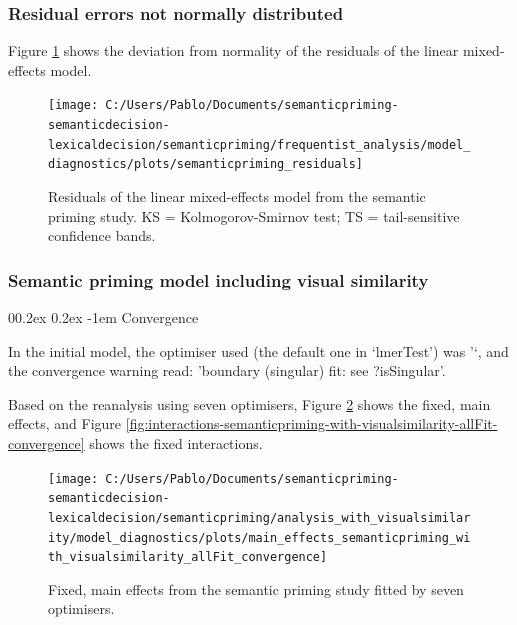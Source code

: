 \documentclass[
  12pt,
  man,floatsintext]{apa7}
\makeatletter
\let\oldparagraph\paragraph
\renewcommand{\paragraph}[1]{\oldparagraph{#1}\mbox{}}
\renewcommand{\paragraph}{\@startsection{paragraph}{4}{\parindent}%
  {0\baselineskip \@plus 0.2ex \@minus 0.2ex}%
  {-1em}%
  {\normalfont\normalsize\bfseries\itshape\typesectitle}}
\makeatother
\begin{document}
\hypertarget{residual-errors-not-normally-distributed-1}{%
\subsubsection{Residual errors not normally distributed}\label{residual-errors-not-normally-distributed-1}}

Figure \ref{fig:semanticpriming-residuals} shows the deviation from normality of the residuals of the linear mixed-effects model.

\begin{figure}

{\centering \texttt{[image: C:/Users/Pablo/Documents/semanticpriming-semanticdecision-lexicaldecision/semanticpriming/frequentist\_analysis/model\_diagnostics/plots/semanticpriming\_residuals]} 

}

\caption{Residuals of the linear mixed-effects model from the semantic priming study. \linebreak KS = Kolmogorov-Smirnov test; TS = tail-sensitive confidence bands.}\label{fig:semanticpriming-residuals}
\end{figure}

\hypertarget{semantic-priming-model-including-visual-similarity}{%
\subsubsection{Semantic priming model including visual similarity}\label{semantic-priming-model-including-visual-similarity}}

\hypertarget{convergence-3}{%
\paragraph{Convergence}\label{convergence-3}}

In the initial model, the optimiser used (the default one in `lmerTest') was '`, and the convergence warning read: 'boundary (singular) fit: see ?isSingular'.

Based on the reanalysis using seven optimisers, Figure \ref{fig:main-effects-semanticpriming-with-visualsimilarity-allFit-convergence} shows the fixed, main effects, and Figure \ref{fig:interactions-semanticpriming-with-visualsimilarity-allFit-convergence} shows the fixed interactions.

\begin{figure}

{\centering \texttt{[image: C:/Users/Pablo/Documents/semanticpriming-semanticdecision-lexicaldecision/semanticpriming/analysis\_with\_visualsimilarity/model\_diagnostics/plots/main\_effects\_semanticpriming\_with\_visualsimilarity\_allFit\_convergence]} 

}

\caption{Fixed, main effects from the semantic priming study fitted by seven optimisers.}\label{fig:main-effects-semanticpriming-with-visualsimilarity-allFit-convergence}
\end{figure}
\end{document}
